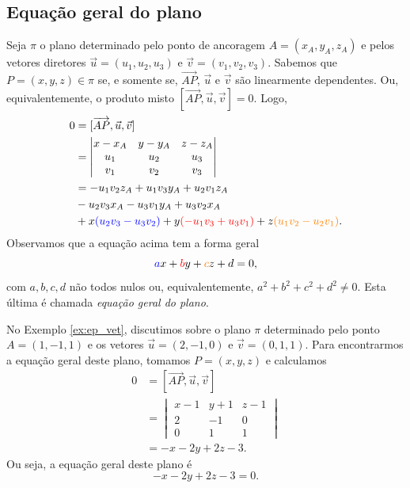 \subsection{Equação geral do plano}

Seja $\pi$ o plano determinado pelo ponto de ancoragem $A=(x_A,y_A,z_A)$ e pelos vetores diretores $\vec{u}=(u_1,u_2,u_3)$ e $\vec{v} = (v_1,v_2,v_3)$. Sabemos que $P=(x,y,z)\in\pi$ se, e somente se, $\overrightarrow{AP}$, $\vec{u}$ e $\vec{v}$ são linearmente dependentes. Ou, equivalentemente, o produto misto $[\overrightarrow{AP},\vec{u},\vec{v}] = 0$. Logo,
\begin{align}
  0 &= [\overrightarrow{AP},\vec{u},\vec{v}] \\
    &=
      \begin{vmatrix}
        x-x_A & y-y_A & z-z_A \\
        u_1 & u_2 & u_3 \\
        v_1 & v_2 & v_3
      \end{vmatrix} \\
    &= -u_1v_2z_A + u_1v_3y_A + u_2v_1z_A \\
    &- u_2v_3x_A - u_3v_1y_A + u_3v_2x_A \\
    &+ x{\color{blue}(u_2v_3 - u_3v_2)} + y{\color{red}(-u_1v_3 + u_3v_1)} + z{\color{orange}(u_1v_2 - u_2v_1)}.
\end{align}
Observamos que a equação acima tem a forma geral
\begin{equation}
  {\color{blue}a}x + {\color{red}b}y + {\color{orange}c}z + d = 0,
\end{equation}
com $a,b,c,d$ não todos nulos ou, equivalentemente, $a^2+b^2+c^2+d^2\neq 0$. Esta última é chamada \emph{equação geral do plano}.

\begin{ex}
  No Exemplo \ref{ex:ep_vet}, discutimos sobre o plano $\pi$ determinado pelo ponto $A = (1,-1,1)$ e os vetores $\vec{u}=(2,-1,0)$ e $\vec{v}=(0,1,1)$. Para encontrarmos a equação geral deste plano, tomamos $P = (x,y,z)$ e calculamos
  \begin{align}
    0 &= [\overrightarrow{AP},\vec{u},\vec{v}]\\
      &=
        \begin{vmatrix}
          x-1 & y+1 & z-1 \\
          2 & -1 & 0 \\
          0 & 1 & 1
        \end{vmatrix}\\
      &= - x - 2 y + 2 z - 3.
  \end{align}
  Ou seja, a equação geral deste plano é
  \begin{equation}
    -x - 2y + 2z -3 = 0.
  \end{equation}
\end{ex}


